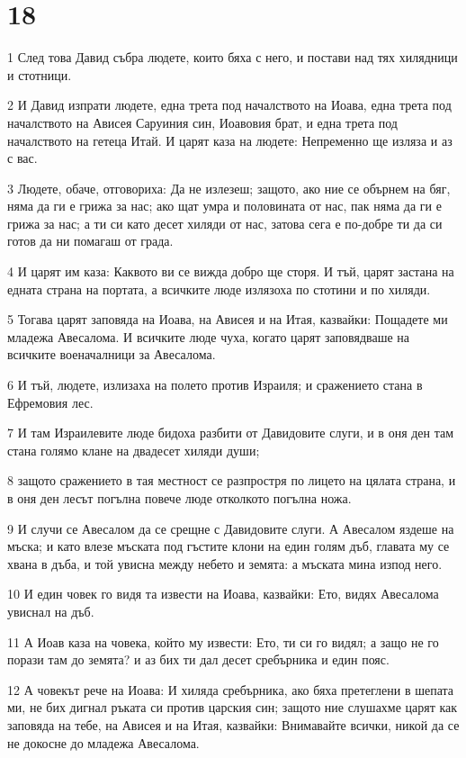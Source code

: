 \chapter{18}

\par 1 След това Давид събра людете, които бяха с него, и постави над тях хилядници и стотници.
\par 2 И Давид изпрати людете, една трета под началството на Иоава, една трета под началството на Ависея Саруиния син, Иоавовия брат, и една трета под началството на гетеца Итай. И царят каза на людете: Непременно ще изляза и аз с вас.
\par 3 Людете, обаче, отговориха: Да не излезеш; защото, ако ние се обърнем на бяг, няма да ги е грижа за нас; ако щат умра и половината от нас, пак няма да ги е грижа за нас; а ти си като десет хиляди от нас, затова сега е по-добре ти да си готов да ни помагаш от града.
\par 4 И царят им каза: Каквото ви се вижда добро ще сторя. И тъй, царят застана на едната страна на портата, а всичките люде излязоха по стотини и по хиляди.
\par 5 Тогава царят заповяда на Иоава, на Ависея и на Итая, казвайки: Пощадете ми младежа Авесалома. И всичките люде чуха, когато царят заповядваше на всичките военачалници за Авесалома.
\par 6 И тъй, людете, излизаха на полето против Израиля; и сражението стана в Ефремовия лес.
\par 7 И там Израилевите люде бидоха разбити от Давидовите слуги, и в оня ден там стана голямо клане на двадесет хиляди души;
\par 8 защото сражението в тая местност се разпростря по лицето на цялата страна, и в оня ден лесът погълна повече люде отколкото погълна ножа.
\par 9 И случи се Авесалом да се срещне с Давидовите слуги. А Авесалом яздеше на мъска; и като влезе мъската под гъстите клони на един голям дъб, главата му се хвана в дъба, и той увисна между небето и земята: а мъската мина изпод него.
\par 10 И един човек го видя та извести на Иоава, казвайки: Ето, видях Авесалома увиснал на дъб.
\par 11 А Иоав каза на човека, който му извести: Ето, ти си го видял; а защо не го порази там до земята? и аз бих ти дал десет сребърника и един пояс.
\par 12 А човекът рече на Иоава: И хиляда сребърника, ако бяха претеглени в шепата ми, не бих дигнал ръката си против царския син; защото ние слушахме царят как заповяда на тебе, на Ависея и на Итая, казвайки: Внимавайте всички, никой да се не докосне до младежа Авесалома.
